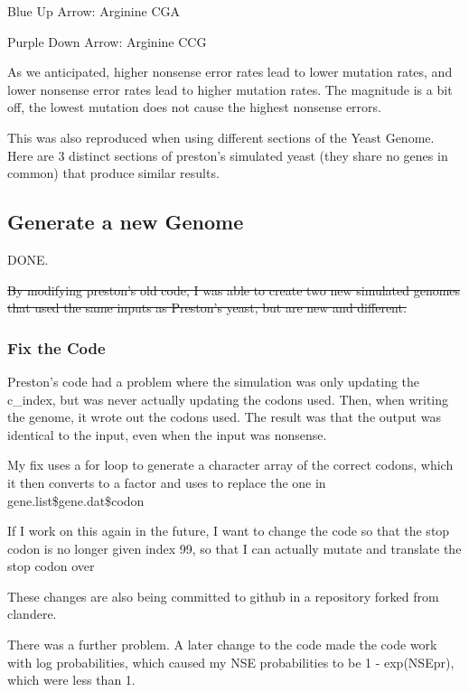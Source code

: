 Blue Up Arrow: Arginine CGA

Purple Down Arrow: Arginine CCG

As we anticipated, higher nonsense error rates lead to lower mutation rates, and lower nonsense error rates lead to higher mutation rates. The magnitude is a bit off, the lowest mutation does not cause the highest nonsense errors.

This was also reproduced when using different sections of the Yeast Genome. Here are 3 distinct sections of preston's simulated yeast (they share no genes in common) that produce similar results.






\subsection{Generate a new Genome}

DONE.

\sout{By modifying preston's old code, I was able to create two new simulated genomes that used the same inputs as Preston's yeast, but are new and different.}

\subsubsection{Fix the Code}

Preston's code had a problem where the simulation was only updating the c\_index, but was never actually updating the codons used. Then, when writing the genome, it wrote out the codons used. The result was that the output was identical to the input, even when the input was nonsense.

My fix uses a for loop to generate a character array of the correct codons, which it then converts to a factor and uses to replace the one in gene.list\$gene.dat\$codon

If I work on this again in the future, I want to change the code so that the stop codon is no longer given index 99, so that I can actually mutate and translate the stop codon over

These changes are also being committed to github in a repository forked from clandere.

There was a further problem. A later change to the code made the code work with log probabilities, which caused my NSE probabilities to be 1 - exp(NSEpr), which were less than 1.

